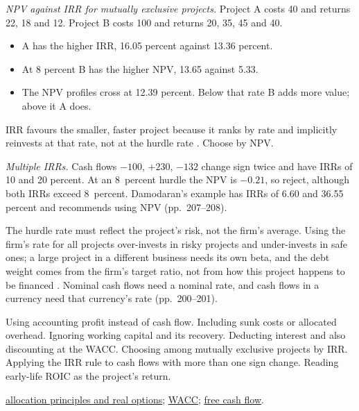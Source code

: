 \begin{qfmethod}
\emph{NPV against IRR for mutually exclusive projects.} Project A costs 40 and returns 22, 18 and 12. Project B costs 100 and returns 20, 35, 45 and 40.
\begin{itemize}
\item A has the higher IRR, 16.05 percent against 13.36 percent.
\item At 8 percent B has the higher NPV, 13.65 against 5.33.
\item The NPV profiles cross at 12.39 percent. Below that rate B adds more value; above it A does.
\end{itemize}
IRR favours the smaller, faster project because it ranks by rate and implicitly reinvests at that rate, not at the hurdle rate \citep[pp.~207--208, 232--233]{applied-corporate-finance-2014}. Choose by NPV.

\emph{Multiple IRRs.} Cash flows $-100$, $+230$, $-132$ change sign twice and have IRRs of 10 and 20 percent. At an 8~percent hurdle the NPV is $-0.21$, so reject, although both IRRs exceed 8~percent. Damodaran's example has IRRs of 6.60 and 36.55 percent and recommends using NPV (pp.~207--208).

 The hurdle rate must reflect the project's risk, not the firm's average. Using the firm's rate for all projects over-invests in risky projects and under-invests in safe ones; a large project in a different business needs its own beta, and the debt weight comes from the firm's target ratio, not from how this project happens to be financed \citep[pp.~162--164]{applied-corporate-finance-2014}. Nominal cash flows need a nominal rate, and cash flows in a currency need that currency's rate (pp.~200--201).

 Using accounting profit instead of cash flow. Including sunk costs or allocated overhead. Ignoring working capital and its recovery. Deducting interest and also discounting at the WACC. Choosing among mutually exclusive projects by IRR. Applying the IRR rule to cash flows with more than one sign change. Reading early-life ROIC as the project's return.

 \hyperref[meth:capital-allocation-principles]{allocation principles and real options}; \hyperref[meth:wacc-calculation]{WACC}; \hyperref[meth:free-cash-flow-coverage]{free cash flow}.

\end{qfmethod}


